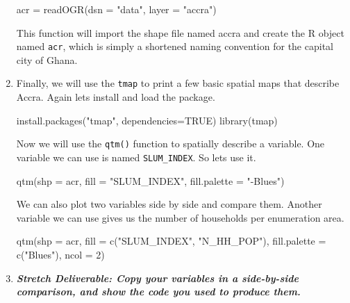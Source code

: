 \documentclass{article}
\newenvironment{Schunk}{}{}
\newcommand{\code}[1]{\texttt{#1}}
\newcommand{\pkg}[1]{\mbox{\texttt{#1}}}
\newcommand{\proglang}[1]{\textsf{#1}}
\begin{document}
\begin{enumerate}[leftmargin=15mm]
\begin{Schunk}
\begin{Sinput}
acr = readOGR(dsn = "data", layer = "accra")
\end{Sinput}
\end{Schunk}

This function will import the shape file named accra and create the \proglang{R} object named \code{acr}, which is simply a shortened naming convention for the capital city of Ghana.

\item Finally, we will use the \pkg{tmap} to print a few basic spatial maps that describe Accra.  Again lets install and load the package.

\begin{Schunk}
\begin{Sinput}
install.packages("tmap", dependencies=TRUE)
library(tmap)
\end{Sinput}
\end{Schunk}

Now we will use the \code{qtm()} function to spatially describe a variable.  One variable we can use is named \code{SLUM\_INDEX}.  So lets use it.

\begin{Schunk}
\begin{Sinput}
qtm(shp = acr, fill = "SLUM_INDEX", 
fill.palette = "-Blues")
\end{Sinput}
\end{Schunk}

We can also plot two variables side by side and compare them.  Another variable we can use gives us the number of households per enumeration area.

\begin{Schunk}
\begin{Sinput}
qtm(shp = acr, fill = c("SLUM_INDEX", "N_HH_POP"), 
fill.palette = c("Blues"), ncol = 2)
\end{Sinput}
\end{Schunk}



\item \textbf{\textit{Stretch Deliverable: Copy your variables in a side-by-side comparison, and show the code you used to produce them. }}
\end{enumerate}


\setlength{\leftskip}{0cm}






\setlength{\leftskip}{0cm}


\end{document}
